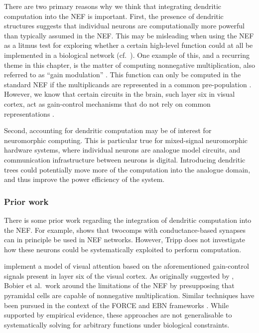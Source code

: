 There are two primary reasons why we think that integrating dendritic computation into the NEF is important.
First, the presence of dendritic structures suggests that individual neurons are computationally more powerful than typically assumed in the NEF.
This may be misleading when using the NEF as a litmus test for exploring whether a certain high-level function could at all be implemented in a biological network (cf.~).
One example of this, and a recurring theme in this chapter, is the matter of computing nonnegative multiplication, also referred to as \enquote{gain modulation} \citep{salinas2000gain}.
This function can only be computed in the standard NEF if the multiplicands are represented in a common pre-population \citep[Section~6.3]{eliasmith2003neural}.
However, we know that certain circuits in the brain, such layer six in visual cortex, act as gain-control mechanisms that do not rely on common representations \citep{olsen2012gain,bobier2014unifying}.

Second, accounting for dendritic computation may be of interest for neuromorphic computing.
This is particular true for mixed-signal neuromorphic hardware systems, where individual neurons are analogue model circuits, and communication infrastructure between neurons is digital.
Introducing dendritic trees could potentially move more of the computation into the analogue domain, and thus improve the power efficiency of the system.

\subsubsection{Prior work}
There is some prior work regarding the integration of dendritic computation into the NEF.
For example,  shows that \glspl{twocomp} with conductance-based synapses can in principle be used in NEF networks.
However, Tripp does not investigate how these neurons could be systematically exploited to perform computation.

 implement a model of visual attention based on the aforementioned gain-control signals present in layer six of the visual cortex.
As originally suggested by , Bobier et al.~work around the limitations of the NEF by presupposing that pyramidal cells are capable of nonnegative multiplication.
Similar techniques have been pursued in the context of the FORCE and EBN frameworks \citep{thalmeier2016learning,alemi2018learning}.
While supported by empirical evidence, these approaches are not generalisable to systematically solving for arbitrary functions under biological constraints.

